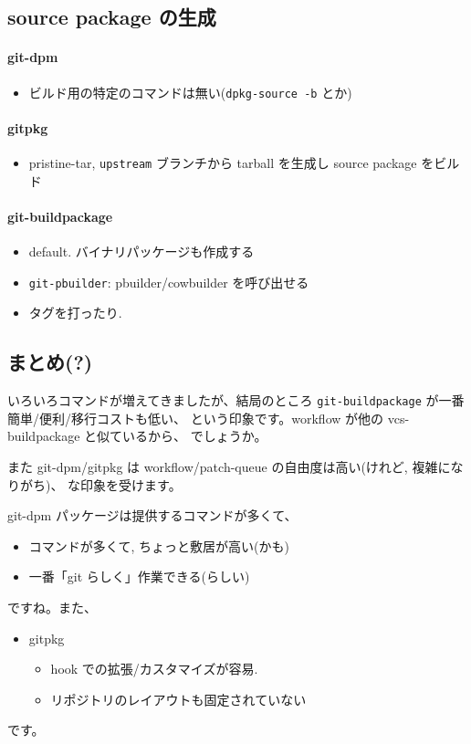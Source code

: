 \documentclass[mingoth,a4paper]{jsarticle}
\begin{document}
\subsection*{source package の生成}

\paragraph{git-dpm}

\begin{itemize}
\item ビルド用の特定のコマンドは無い(\texttt{dpkg-source -b} とか)
\end{itemize}
\paragraph{gitpkg}

\begin{itemize}
\item pristine-tar, \texttt{upstream} ブランチから tarball を生成し
      source package をビルド
\end{itemize}
\paragraph{git-buildpackage}

\begin{itemize}
\item default. バイナリパッケージも作成する
\item \texttt{git-pbuilder}: pbuilder/cowbuilder を呼び出せる
\item タグを打ったり.
\end{itemize}
\subsection*{まとめ(?)}

いろいろコマンドが増えてきましたが、結局のところ
\texttt{git-buildpackage} が一番簡単/便利/移行コストも低い、
という印象です。workflow が他の vcs-buildpackage と似ているから、
でしょうか。

また git-dpm/gitpkg は
workflow/patch-queue の自由度は高い(けれど, 複雑になりがち)、
な印象を受けます。

git-dpm パッケージは提供するコマンドが多くて、
\begin{itemize}
  \item コマンドが多くて, ちょっと敷居が高い(かも)
  \item 一番「git らしく」作業できる(らしい)
\end{itemize}
ですね。また、
\begin{itemize}
\item gitpkg
  \begin{itemize}
  \item hook での拡張/カスタマイズが容易.
  \item リポジトリのレイアウトも固定されていない
  \end{itemize}
\end{itemize}
です。
\end{document}
